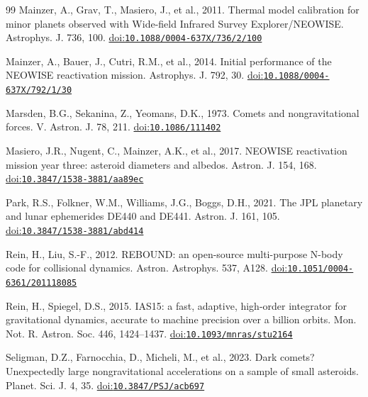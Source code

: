 \documentclass[3p,11pt]{elsarticle}
\begin{document}
\begin{thebibliography}{99}
Mainzer, A., Grav, T., Masiero, J., et al., 2011. Thermal model calibration for minor planets
observed with Wide-field Infrared Survey Explorer/NEOWISE. Astrophys. J. 736, 100.
\href{https://doi.org/10.1088/0004-637X/736/2/100}{doi:\nolinkurl{10.1088/0004-637X/736/2/100}}

Mainzer, A., Bauer, J., Cutri, R.M., et al., 2014. Initial performance of the NEOWISE
reactivation mission. Astrophys. J. 792, 30. \href{https://doi.org/10.1088/0004-637X/792/1/30}{doi:\nolinkurl{10.1088/0004-637X/792/1/30}}

Marsden, B.G., Sekanina, Z., Yeomans, D.K., 1973. Comets and nongravitational forces. V.
Astron. J. 78, 211. \href{https://doi.org/10.1086/111402}{doi:\nolinkurl{10.1086/111402}}

Masiero, J.R., Nugent, C., Mainzer, A.K., et al., 2017. NEOWISE reactivation mission year
three: asteroid diameters and albedos. Astron. J. 154, 168.
\href{https://doi.org/10.3847/1538-3881/aa89ec}{doi:\nolinkurl{10.3847/1538-3881/aa89ec}}

Park, R.S., Folkner, W.M., Williams, J.G., Boggs, D.H., 2021. The JPL planetary and lunar
ephemerides DE440 and DE441. Astron. J. 161, 105. \href{https://doi.org/10.3847/1538-3881/abd414}{doi:\nolinkurl{10.3847/1538-3881/abd414}}

Rein, H., Liu, S.-F., 2012. REBOUND: an open-source multi-purpose N-body code for
collisional dynamics. Astron. Astrophys. 537, A128. \href{https://doi.org/10.1051/0004-6361/201118085}{doi:\nolinkurl{10.1051/0004-6361/201118085}}

Rein, H., Spiegel, D.S., 2015. IAS15: a fast, adaptive, high-order integrator for
gravitational dynamics, accurate to machine precision over a billion orbits. Mon. Not. R.
Astron. Soc. 446, 1424--1437. \href{https://doi.org/10.1093/mnras/stu2164}{doi:\nolinkurl{10.1093/mnras/stu2164}}

Seligman, D.Z., Farnocchia, D., Micheli, M., et al., 2023. Dark comets? Unexpectedly large
nongravitational accelerations on a sample of small asteroids. Planet. Sci. J. 4, 35.
\href{https://doi.org/10.3847/PSJ/acb697}{doi:\nolinkurl{10.3847/PSJ/acb697}}


\end{thebibliography}
\end{document}
